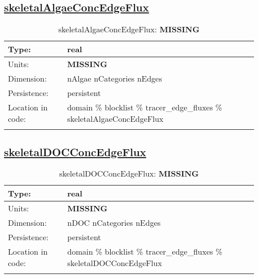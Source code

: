 \subsection[skeletalAlgaeConcEdgeFlux]{\hyperref[sec:var_tab_tracer_edge_fluxes]{skeletalAlgaeConcEdgeFlux}}
\label{subsec:var_sec_tracer_edge_fluxes_skeletalAlgaeConcEdgeFlux}
\begin{center}
\begin{longtable}{| p{2.0in} | p{4.0in} |}
        \hline 
        Type: & real \\
        \hline 
        Units: & {\bf \color{red} MISSING} \\
        \hline 
        Dimension: & nAlgae nCategories nEdges \\
        \hline 
        Persistence: & persistent \\
        \hline 
         Location in code: & domain \% blocklist \% tracer\_edge\_fluxes \% skeletalAlgaeConcEdgeFlux \\
         \hline 
    \caption{skeletalAlgaeConcEdgeFlux: {\bf \color{red} MISSING}}
\end{longtable}
\end{center}
\subsection[skeletalDOCConcEdgeFlux]{\hyperref[sec:var_tab_tracer_edge_fluxes]{skeletalDOCConcEdgeFlux}}
\label{subsec:var_sec_tracer_edge_fluxes_skeletalDOCConcEdgeFlux}
\begin{center}
\begin{longtable}{| p{2.0in} | p{4.0in} |}
        \hline 
        Type: & real \\
        \hline 
        Units: & {\bf \color{red} MISSING} \\
        \hline 
        Dimension: & nDOC nCategories nEdges \\
        \hline 
        Persistence: & persistent \\
        \hline 
         Location in code: & domain \% blocklist \% tracer\_edge\_fluxes \% skeletalDOCConcEdgeFlux \\
         \hline 
    \caption{skeletalDOCConcEdgeFlux: {\bf \color{red} MISSING}}
\end{longtable}
\end{center}

